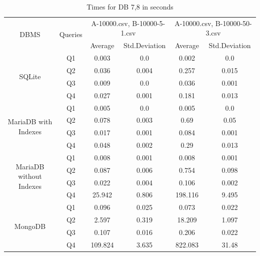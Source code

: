 \documentclass[12pt]{article}
\begin{document}
\begin{table}[H]
    \centering
\begin{tabular}{|c|c|c|c|c|c|}
    \hline
    \multirow{2}{*}{DBMS} & \multirow{2}{*}{Queries} & \multicolumn{2}{c|}{A-10000.csv, B-10000-5-1.csv} & \multicolumn{2}{c|}{A-10000.csv, B-10000-50-3.csv}\\
    \cline{3-6}
     & & Average & Std.Deviation & Average & Std.Deviation\\
    \hline
     \multirow{4}{*}{SQLite} & Q1 & 0.003 & 0.0 & 0.002 & 0.0 \\
\cline{2-6}
& Q2 & 0.036 & 0.004 & 0.257 & 0.015 \\
\cline{2-6}
& Q3 & 0.009 & 0.0 & 0.036 & 0.001 \\
\cline{2-6}
& Q4 & 0.027 & 0.001 & 0.181 & 0.013 \\
     \cline{2-6}
     \hline
     \multirow{4}{*}{MariaDB with Indexes} 
& Q1 & 0.005 & 0.0 & 0.005 & 0.0 \\
\cline{2-6}
& Q2 & 0.078 & 0.003 & 0.69 & 0.05 \\
\cline{2-6}
& Q3 & 0.017 & 0.001 & 0.084 & 0.001 \\
\cline{2-6}
& Q4 & 0.048 & 0.002 & 0.29 & 0.013 \\
     \cline{2-6}
    \hline
    \multirow{4}{*}{MariaDB without Indexes} 
& Q1 & 0.008 & 0.001 & 0.008 & 0.001 \\
\cline{2-6}
& Q2 & 0.087 & 0.006 & 0.754 & 0.098 \\
\cline{2-6}
& Q3 & 0.022 & 0.004 & 0.106 & 0.002 \\
\cline{2-6}
& Q4 & 25.942 & 0.806 & 198.116 & 9.495 \\
     \cline{2-6}
    \hline
    \multirow{4}{*}{MongoDB} 
& Q1 & 0.096 & 0.025 & 0.073 & 0.022 \\
\cline{2-6}
& Q2 & 2.597 & 0.319 & 18.209 & 1.097 \\
\cline{2-6}
& Q3 & 0.107 & 0.016 & 0.206 & 0.022 \\
\cline{2-6}
& Q4 & 109.824 & 3.635 & 822.083 & 31.48 \\

     \cline{2-6}
    \hline
\end{tabular}

    \caption{Times for DB 7,8 in seconds}
    \label{tab:my_label}
\end{table}

\newpage
\end{document}
